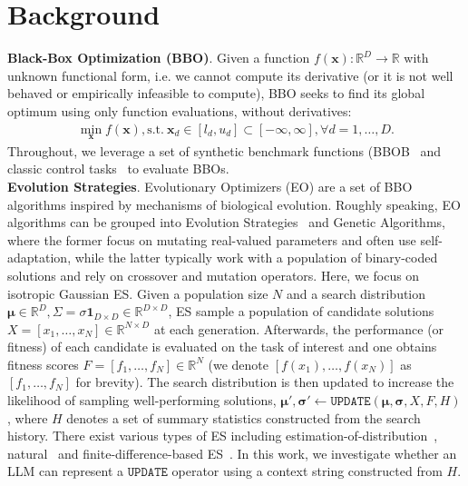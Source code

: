 \section{Background}
\textbf{Black-Box Optimization (BBO)}. Given a function $f(\mathbf{x}): \mathbb{R}^D \to \mathbb{R}$ with unknown functional form, i.e. we cannot compute its derivative (or it is not well behaved or empirically infeasible to compute), BBO seeks to find its global optimum using only function evaluations, without derivatives:
%
\begin{align*}
    \min_\mathbf{x} f(\mathbf{x}), \text{s.t.} \ \mathbf{x}_d \in [l_d, u_d] \subset [-\infty, \infty], \forall d=1,\dots,D.
\end{align*}
%
Throughout, we leverage a set of synthetic benchmark functions (BBOB~\cite{hansen2010real} and classic control tasks~\cite{brockman2016openai} to evaluate BBOs.\\
%
\textbf{Evolution Strategies}. Evolutionary Optimizers (EO) are a set of BBO algorithms inspired by mechanisms of biological evolution. Roughly speaking, EO algorithms can be grouped into Evolution Strategies~\cite{rechenberg1978evolutionsstrategien} and Genetic Algorithms, where the former focus on mutating real-valued parameters and often use self-adaptation, while the latter typically work with a population of binary-coded solutions and rely on crossover and mutation operators.
%
Here, we focus on isotropic Gaussian ES. Given a population size $N$ and a search distribution $\boldsymbol{\mu} \in \mathbb{R}^D, \Sigma = \sigma \mathbf{1}_{D \times D} \in \mathbb{R}^{D \times D}$, ES sample a population of candidate solutions $X = [x_1, \dots, x_N] \in \mathbb{R}^{N \times D}$ at each generation. Afterwards, the performance (or fitness) of each candidate is evaluated on the task of interest and one obtains fitness scores $F=[f_1, \dots, f_N] \in \mathbb{R}^N$ (we denote $[f(x_1), \dots, f(x_N)]$ as $[f_1, \dots, f_N]$ for brevity). The search distribution is then updated to increase the likelihood of sampling well-performing solutions, $\boldsymbol{\mu}', \boldsymbol{\sigma}' \leftarrow \texttt{UPDATE}(\boldsymbol{\mu}, \boldsymbol{\sigma}, X, F, H)$, where $H$ denotes a set of summary statistics constructed from the search history. There exist various types of ES including estimation-of-distribution~\cite{hansen2006cma}, natural~\cite{schaul2011high, wierstra2014natural} and finite-difference-based ES~\cite{salimans2017evolution}. In this work, we investigate whether an LLM can represent a $\texttt{UPDATE}$ operator using a context string constructed from $H$.\\
